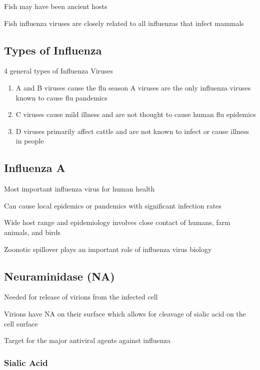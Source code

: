 \documentclass{notes}
\begin{document}

Fish may have been ancient hosts

\tab \indicates Fish influenza viruses are closely related to all influenzas that infect mammals

\subsection{Types of Influenza}

4 general types of Influenza Viruses

\begin{enumerate}
    \item A and B viruses cause the flu season
    \subitem A viruses are the only influenza viruses known to cause flu pandemics
    \item C viruses cause mild illness and are not thought to cause human flu epidemics
    \item D viruses primarily affect cattle and are not known to infect or cause illness in people
\end{enumerate}

\subsection{Influenza A}

Most important influenza virus for human health

\tab Can cause local epidemics or pandemics with significant infection rates

\tab Wide host range and epidemiology involves close contact of humans, farm animals, and birds

Zoonotic spillover plays an important role of influenza virus biology

\subsection{Neuraminidase (NA)}

Needed for release of virions from the infected cell

\tab Virions have NA on their surface which allows for cleavage of sialic acid on the cell surface

\tab Target for the major antiviral agents against influenza

\subsubsection{Sialic Acid}
\end{document}
